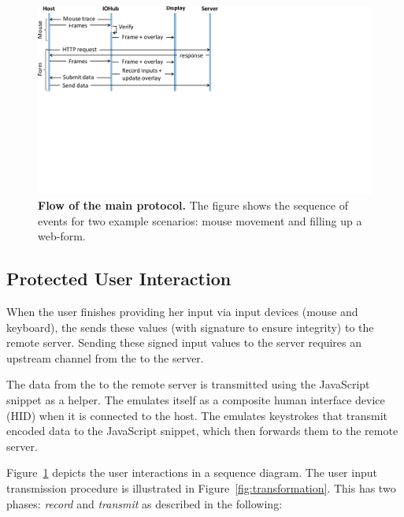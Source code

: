 \begin{figure}[t]
\centering
\includegraphics[trim={0 9.5cm 15cm 0}, clip, width=0.85\linewidth]{chapters/ProtectIOn/images/SequencDiagram.pdf}
\caption[Flow of the \name main protocol]{\textbf{Flow of the \name main protocol.} The figure shows the sequence of events for two example scenarios: mouse movement and filling up a web-form.}
\spacesave
\label{fig:sequence}
\centering
\end{figure}


\subsection{Protected User Interaction}
\label{sec:systemDesign:commit}

When the user finishes providing her input via input devices (mouse and keyboard), the \device sends these values (with signature to ensure integrity) to the remote server. Sending these signed input values to the server requires an upstream channel from the \device to the server. 


\label{sec:systemDesign:commit:upload} 
The data from the \device to the remote server is transmitted using the \name JavaScript snippet as a helper. 
The \device emulates itself as a composite human interface device (HID) when it is connected to the host. The \device emulates keystrokes that transmit encoded data to the \name JavaScript snippet, which then forwards them to the remote server.


 Figure~\ref{fig:sequence} depicts the user interactions in a sequence diagram. The user input transmission procedure is illustrated in Figure~\ref{fig:transformation}. This has two phases: \emph{record} and \emph{transmit} as described in the following:

